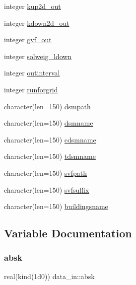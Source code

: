 \begin{DoxyCompactItemize}
\item 
integer \hyperlink{namespacedata__in_acaad819231464876d06a326598caf5d1}{kup2d\+\_\+out}
\item 
integer \hyperlink{namespacedata__in_aca062f5e8ccbe43035af3dd5d7199ac4}{kdown2d\+\_\+out}
\item 
integer \hyperlink{namespacedata__in_a6e0cf4ed5e44b4ec04403466ed583117}{gvf\+\_\+out}
\item 
integer \hyperlink{namespacedata__in_ad47d3fca8d8d48dabc51d4838153fab9}{solweig\+\_\+ldown}
\item 
integer \hyperlink{namespacedata__in_aa192321c93659ded79b2485baaa901b3}{outinterval}
\item 
integer \hyperlink{namespacedata__in_ae2ab3d89e50ddafe5bdb6f79aeb6d690}{runforgrid}
\item 
character(len=150) \hyperlink{namespacedata__in_a682487b527aac38b57ec89a935d5c4bc}{dsmpath}
\item 
character(len=150) \hyperlink{namespacedata__in_a1d1b3d576c2ec06ca44f4ce7bbcd7532}{dsmname}
\item 
character(len=150) \hyperlink{namespacedata__in_adbc74fe8df00866071b1a4717dcd596c}{cdsmname}
\item 
character(len=150) \hyperlink{namespacedata__in_a3c00e15acbb88a04c775598e59d70f87}{tdsmname}
\item 
character(len=150) \hyperlink{namespacedata__in_a5e692de4d121a71a5a0fd4bcd9d640d2}{svfpath}
\item 
character(len=150) \hyperlink{namespacedata__in_a30a09c738fb29d9032e8a4cf1018b0d9}{svfsuffix}
\item 
character(len=150) \hyperlink{namespacedata__in_ab3871d34bee8f498572c4fae8900e97e}{buildingsname}
\end{DoxyCompactItemize}


\subsection{Variable Documentation}
\mbox{\label{namespacedata__in_a3d4be49c81c1b70a22e0eee6d542cd59}} 
\subsubsection{\texorpdfstring{absk}{absk}}
{\footnotesize\ttfamily real(kind(1d0)) data\+\_\+in\+::absk}



